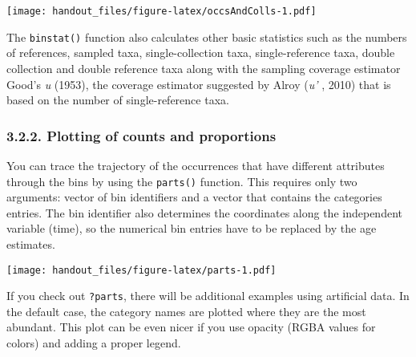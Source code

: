 \documentclass[]{article}
\newenvironment{Shaded}{\begin{snugshade}}{\end{snugshade}}
\newcommand{\KeywordTok}[1]{\textcolor[rgb]{0.13,0.29,0.53}{\textbf{{#1}}}}
\newcommand{\DataTypeTok}[1]{\textcolor[rgb]{0.13,0.29,0.53}{{#1}}}
\newcommand{\DecValTok}[1]{\textcolor[rgb]{0.00,0.00,0.81}{{#1}}}
\newcommand{\StringTok}[1]{\textcolor[rgb]{0.31,0.60,0.02}{{#1}}}
\newcommand{\CommentTok}[1]{\textcolor[rgb]{0.56,0.35,0.01}{\textit{{#1}}}}
\newcommand{\NormalTok}[1]{{#1}}
\begin{document}
\texttt{[image: handout\_files/figure-latex/occsAndColls-1.pdf]}

The \texttt{binstat()} function also calculates other basic statistics
such as the numbers of references, sampled taxa, single-collection taxa,
single-reference taxa, double collection and double reference taxa along
with the sampling coverage estimator Good's \emph{u} (1953), the
coverage estimator suggested by Alroy (\emph{u' }, 2010) that is based
on the number of single-reference taxa.

\subsubsection{3.2.2. Plotting of counts and
proportions}\label{plotting-of-counts-and-proportions}

You can trace the trajectory of the occurrences that have different
attributes through the bins by using the \texttt{parts()} function. This
requires only two arguments: vector of bin identifiers and a vector that
contains the categories entries. The bin identifier also determines the
coordinates along the independent variable (time), so the numerical bin
entries have to be replaced by the age estimates.

\begin{Shaded}
\end{Shaded}

\texttt{[image: handout\_files/figure-latex/parts-1.pdf]}

If you check out \texttt{?parts}, there will be additional examples
using artificial data. In the default case, the category names are
plotted where they are the most abundant. This plot can be even nicer if
you use opacity (RGBA values for colors) and adding a proper legend.
\end{document}
